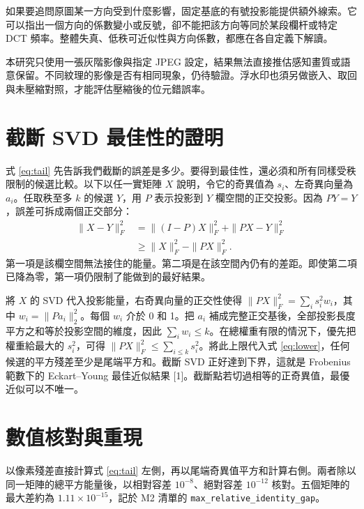 \documentclass[12pt,a4paper,onecolumn]{article}
\renewcommand{\normalsize}{\fontsize{12bp}{19bp}\selectfont}
\begin{document}
如果要追問原圖某一方向受到什麼影響，固定基底的有號投影能提供額外線索。它可以指出一個方向的係數變小或反號，卻不能把該方向等同於某段欄杆或特定 DCT 頻率。整體失真、低秩可近似性與方向係數，都應在各自定義下解讀。

本研究只使用一張灰階影像與指定 JPEG 設定，結果無法直接推估感知畫質或語意保留。不同紋理的影像是否有相同現象，仍待驗證。浮水印也須另做嵌入、取回與未壓縮對照，才能評估壓縮後的位元錯誤率。

\endgroup
\appendix
\renewcommand{\normalsize}{\fontsize{12bp}{16.5bp}\selectfont}
\normalsize
\setlength{\parskip}{2bp}
\section{截斷 SVD 最佳性的證明}
式 \eqref{eq:tail} 先告訴我們截斷的誤差是多少。要得到最佳性，還必須和所有同樣受秩限制的候選比較。以下以任一實矩陣 $X$ 說明，令它的奇異值為 $s_i$、左奇異向量為 $a_i$。任取秩至多 $k$ 的候選 $Y$，用 $P$ 表示投影到 $Y$ 欄空間的正交投影。因為 $PY=Y$，誤差可拆成兩個正交部分：
\begin{align}
\|X-Y\|_F^2
 &=\|(I-P)X\|_F^2+\|PX-Y\|_F^2\\
 &\ge \|X\|_F^2-\|PX\|_F^2. \label{eq:lower}
\end{align}
第一項是該欄空間無法接住的能量。第二項是在該空間內仍有的差距。即使第二項已降為零，第一項仍限制了能做到的最好結果。

將 $X$ 的 SVD 代入投影能量，右奇異向量的正交性使得 $\|PX\|_F^2=\sum_i s_i^2 w_i$，其中 $w_i=\|Pa_i\|_2^2$。每個 $w_i$ 介於 0 和 1。把 $a_i$ 補成完整正交基後，全部投影長度平方之和等於投影空間的維度，因此 $\sum_i w_i\le k$。在總權重有限的情況下，優先把權重給最大的 $s_i^2$，可得 $\|PX\|_F^2\le\sum_{i\le k}s_i^2$。將此上限代入式 \eqref{eq:lower}，任何候選的平方殘差至少是尾端平方和。截斷 SVD 正好達到下界，這就是 Frobenius 範數下的 Eckart–Young 最佳近似結果 [1]。截斷點若切過相等的正奇異值，最優近似可以不唯一。

\section{數值核對與重現}

以像素殘差直接計算式 \eqref{eq:tail} 左側，再以尾端奇異值平方和計算右側。兩者除以同一矩陣的總平方能量後，以相對容差 $10^{-8}$、絕對容差 $10^{-12}$ 核對。五個矩陣的最大差約為 $1.11\times10^{-15}$，記於 M2 清單的 \texttt{max\_relative\_identity\_gap}。
\end{document}
